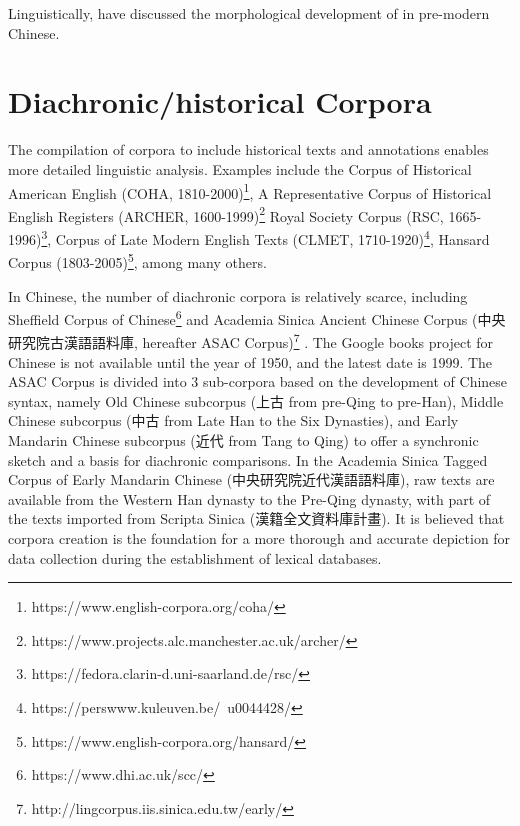 Linguistically, \textcite{wang2005jia} have discussed the morphological development of \jia in pre-modern Chinese.

\section{Diachronic/historical Corpora}
The compilation of corpora to include historical texts and annotations enables more detailed linguistic analysis. Examples include
the Corpus of Historical American English (COHA, 1810-2000)\footnote{https://www.english-corpora.org/coha/}, 
A Representative Corpus of Historical English Registers (ARCHER, 1600-1999)\footnote{https://www.projects.alc.manchester.ac.uk/archer/}
Royal Society Corpus (RSC, 1665-1996)\footnote{https://fedora.clarin-d.uni-saarland.de/rsc/}, 
Corpus of Late Modern English Texts (CLMET, 1710-1920)\footnote{https://perswww.kuleuven.be/~u0044428/}, 
Hansard Corpus (1803-2005)\footnote{https://www.english-corpora.org/hansard/}, among many others.

In Chinese, the number of diachronic corpora is relatively scarce, including Sheffield Corpus of Chinese\footnote{https://www.dhi.ac.uk/scc/} and Academia Sinica Ancient Chinese Corpus (中央研究院古漢語語料庫, hereafter ASAC Corpus)\footnote{http://lingcorpus.iis.sinica.edu.tw/early/} \parencite{wei1997corpus}. The Google books project for Chinese is not available until the year of 1950, and the latest date is 1999. The ASAC Corpus is divided into 3 sub-corpora based on the development of Chinese syntax, namely Old Chinese subcorpus (上古 from pre-Qing to pre-Han), Middle Chinese subcorpus (中古 from Late Han to the Six Dynasties), and Early Mandarin Chinese subcorpus (近代 from Tang to Qing) to offer a synchronic sketch and a basis for diachronic comparisons. In the Academia Sinica Tagged Corpus of Early Mandarin Chinese (中央研究院近代漢語語料庫), raw texts are available from the Western Han dynasty to the Pre-Qing dynasty, with part of the texts imported from Scripta Sinica (漢籍全文資料庫計畫). It is believed that corpora creation is the foundation for a more thorough and accurate depiction for data collection during the establishment of lexical databases.


